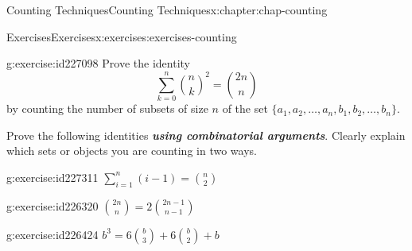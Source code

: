 \documentclass[oneside,10pt,]{book}
\newcommand{\alert}[1]{\textbf{\textit{#1}}}
\numberwithin{equation}{section}
\begin{document}
\begin{chapterptx}{Counting Techniques}{}{Counting Techniques}{}{}{x:chapter:chap-counting}
\begin{exercises-section}{Exercises}{}{Exercises}{}{}{x:exercises:exercises-counting}
\begin{divisionexercise}{25}{}{}{g:exercise:id227098}
Prove the identity%
\begin{equation*}
\sum_{k=0}^n \binom{n}{k}^2 = \binom{2n}{n}
\end{equation*}
by counting the number of subsets of size \(n\) of the set \(\{a_1,a_2,\ldots,a_n,b_1,b_2,\ldots,b_n\}\).%
\end{divisionexercise}%
\par\medskip\noindent%
%
Prove the following identities \alert{using combinatorial arguments}. Clearly explain which sets or objects you are counting in two ways.%
\begin{exercisegroup}
\begin{divisionexerciseeg}{26}{}{}{g:exercise:id227311}%
\(\displaystyle\sum_{i=1}^n (i-1) = \binom{n}{2}\)%
\end{divisionexerciseeg}%
\begin{divisionexerciseeg}{27}{}{}{g:exercise:id226320}%
\(\displaystyle\binom{2n}{n} = 2\binom{2n-1}{n-1}\)%
\end{divisionexerciseeg}%
\begin{divisionexerciseeg}{28}{}{}{g:exercise:id226424}%
\(\displaystyle b^3 = 6\binom{b}{3} + 6\binom{b}{2} + b\)%
\end{divisionexerciseeg}%
\end{exercisegroup}
\par\medskip\noindent
\end{exercises-section}
\end{chapterptx}
%
%
\typeout{************************************************}
\typeout{************************************************}
%
\end{document}
